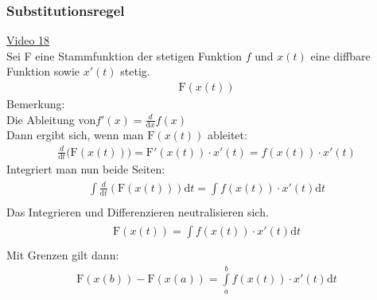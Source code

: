 \subsubsection{Substitutionsregel}
\href{https://youtu.be/Gfg8adsiy84}{Video 18}\\
Sei F eine Stammfunktion der stetigen Funktion $ f $ und $ x(t) $ eine diffbare Funktion sowie $ x'(t) $ stetig.\\
\begin{align*}
\mathrm{F}(x(t))
\end{align*}
Bemerkung:\\
Die Ableitung von$ f'(x) =\frac{d}{\mathrm{d}x}f(x)$\\
Dann ergibt sich, wenn man $ \mathrm{F}(x(t)) $ ableitet:\\
\begin{align*}
\frac{d}{\mathrm{d}t}\big(\mathrm{F}(x(t))\big)=\mathrm{F}'(x(t))\cdot x'(t)=f(x(t))\cdot x'(t)
\end{align*}
Integriert man nun beide Seiten:\\
\begin{align*}
\int\limits_{}^{} \frac{d}{\mathrm{d}t}(\mathrm{F}(x(t)))\mathrm{d}t=\int\limits_{}^{} f(x(t))\cdot x'(t)\mathrm{d}t
\end{align*}
Das Integrieren und Differenzieren neutralisieren sich.\\
\begin{align*}
\mathrm{F}(x(t))=\int\limits_{}^{} f(x(t))\cdot x'(t)\mathrm{d}t
\end{align*}
Mit Grenzen gilt dann:\\
\begin{align*}
\mathrm{F}(x(b))-\mathrm{F}(x(a))=\int\limits_{a}^{b} f(x(t))\cdot x'(t)\mathrm{d}t
\end{align*}
